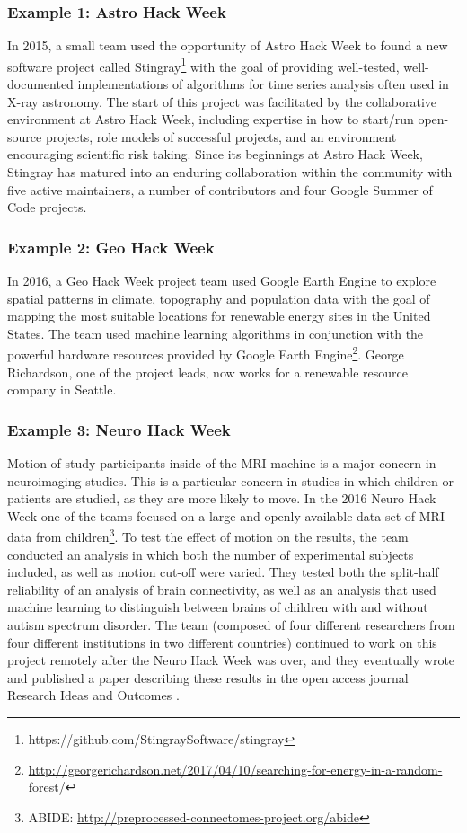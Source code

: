 \subsubsection*{Example 1: Astro Hack Week}
In 2015, a small team used the opportunity of Astro Hack Week to found a new software project called Stingray\footnote{https://github.com/StingraySoftware/stingray} with the goal of providing well-tested, well-documented implementations of algorithms for time series analysis often used in X-ray astronomy.
The start of this project was facilitated by the collaborative environment at Astro Hack Week, including expertise in how to start/run open-source projects, role models of successful projects, and an environment encouraging scientific risk taking.
Since its beginnings at Astro Hack Week, Stingray has matured into an enduring collaboration within the community with five active maintainers, a number of contributors and four Google Summer of Code projects.
\subsubsection*{Example 2: Geo Hack Week}
In 2016, a Geo Hack Week project team used Google Earth Engine to explore spatial patterns in climate, topography and population data with the goal of mapping the most suitable locations for renewable energy sites in the United States.
The team used machine learning algorithms in conjunction with the powerful hardware resources provided by Google Earth Engine\footnote{\url{http://georgerichardson.net/2017/04/10/searching-for-energy-in-a-random-forest/}}.
George Richardson, one of the project leads, now works for a renewable resource company in Seattle.
\subsubsection*{Example 3: Neuro Hack Week}
Motion of study participants inside of the MRI machine is a major concern in neuroimaging studies.
This is a particular concern in studies in which children or patients are studied, as they are more likely to move.
In the 2016 Neuro Hack Week one of the teams focused on a large and openly available data-set of MRI data from children\footnote{ABIDE: \url{http://preprocessed-connectomes-project.org/abide}}.
To test the effect of motion on the results, the team conducted an analysis in which both the number of experimental subjects included, as well as motion cut-off were varied.
They tested both the split-half reliability of an analysis of brain connectivity, as well as an analysis that used machine learning to distinguish between brains of children with and without autism spectrum disorder.
The team (composed of four different researchers from four different institutions in two different countries) continued to work on this project remotely after the Neuro Hack Week was over, and they eventually wrote and published a paper describing these results in the open access journal Research Ideas and Outcomes \cite{leonard2017}.
